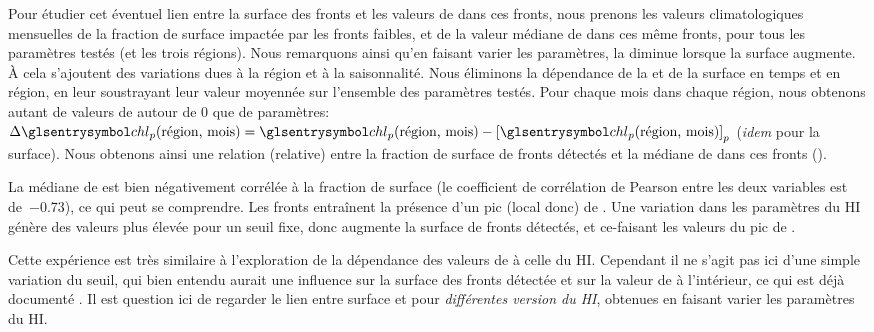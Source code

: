 Pour étudier cet éventuel lien entre la surface des fronts et les valeurs de  dans ces fronts, nous prenons les valeurs climatologiques mensuelles de la fraction de surface impactée par les fronts faibles, et de la valeur médiane de  dans ces même fronts, pour tous les paramètres testés (et les trois régions). Nous remarquons ainsi qu'en faisant varier les paramètres, la  diminue lorsque la surface augmente.
À cela s'ajoutent des variations dues à la région et à la saisonnalité.
Nous éliminons la dépendance de la  et de la surface en temps et en région, en leur soustrayant leur valeur moyennée sur l'ensemble des paramètres testés.
Pour chaque mois dans chaque région, nous obtenons autant de valeurs de  autour de \num{0} que de paramètres: \(\Delta\am{chl}_p(\text{région, mois}) = \am{chl}_p(\text{région, mois}) - \moy{\am{chl}_p(\text{région, mois})}_p\) (\emph{idem} pour la surface).
Nous obtenons ainsi une relation (relative) entre la fraction de surface de fronts détectés et la médiane de  dans ces fronts ().

\begin{figure}
  \centering
  \label{fig:sensibilite-surface}
\end{figure}

La médiane de  est bien négativement corrélée à la fraction de surface (le coefficient de corrélation de Pearson entre les deux variables est de~\num{-0.73}), ce qui peut se comprendre.
Les fronts entraînent la présence d'un pic (local donc) de .
Une variation dans les paramètres du HI génère des valeurs plus élevée pour un seuil fixe, donc augmente la surface de fronts détectés, et ce-faisant  les valeurs du pic de .


\begin{note}
  Cette expérience est très similaire à l'exploration de la dépendance des valeurs de  à celle du HI.
  Cependant il ne s'agit pas ici d'une simple variation du seuil, qui bien entendu aurait une influence sur la surface des fronts détectée et sur la valeur de  à l'intérieur, ce qui est déjà documenté .
  Il est question ici de regarder le lien entre surface et  pour \emph{différentes version du HI}, obtenues en faisant varier les paramètres du HI.
\end{note}

